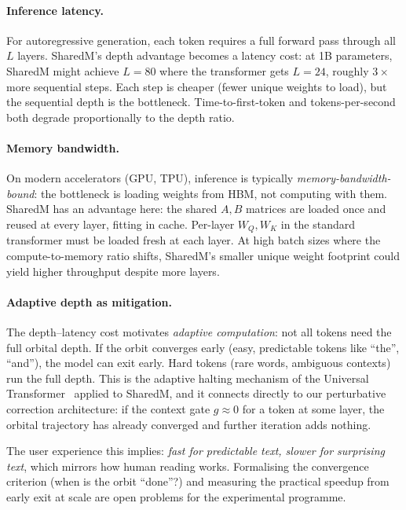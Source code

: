 \documentclass[11pt, a4paper]{article}
\theoremstyle{remark}
\begin{document}
\paragraph{Inference latency.}
For autoregressive generation, each token requires a full forward pass through all $L$ layers.
SharedM's depth advantage becomes a latency cost: at 1B parameters, SharedM might achieve $L = 80$ where the transformer gets $L = 24$, roughly $3\times$ more sequential steps.
Each step is cheaper (fewer unique weights to load), but the sequential depth is the bottleneck.
Time-to-first-token and tokens-per-second both degrade proportionally to the depth ratio.

\paragraph{Memory bandwidth.}
On modern accelerators (GPU, TPU), inference is typically \emph{memory-bandwidth-bound}: the bottleneck is loading weights from HBM, not computing with them.
SharedM has an advantage here: the shared $A, B$ matrices are loaded once and reused at every layer, fitting in cache.
Per-layer $W_Q, W_K$ in the standard transformer must be loaded fresh at each layer.
At high batch sizes where the compute-to-memory ratio shifts, SharedM's smaller unique weight footprint could yield higher throughput despite more layers.

\paragraph{Adaptive depth as mitigation.}
The depth--latency cost motivates \emph{adaptive computation}: not all tokens need the full orbital depth.
If the orbit converges early (easy, predictable tokens like ``the'', ``and''), the model can exit early.
Hard tokens (rare words, ambiguous contexts) run the full depth.
This is the adaptive halting mechanism of the Universal Transformer~\cite{dehghani2019universal} applied to SharedM, and it connects directly to our perturbative correction architecture: if the context gate $g \approx 0$ for a token at some layer, the orbital trajectory has already converged and further iteration adds nothing.

The user experience this implies: \emph{fast for predictable text, slower for surprising text}, which mirrors how human reading works.
Formalising the convergence criterion (when is the orbit ``done''?) and measuring the practical speedup from early exit at scale are open problems for the experimental programme.
\end{document}
